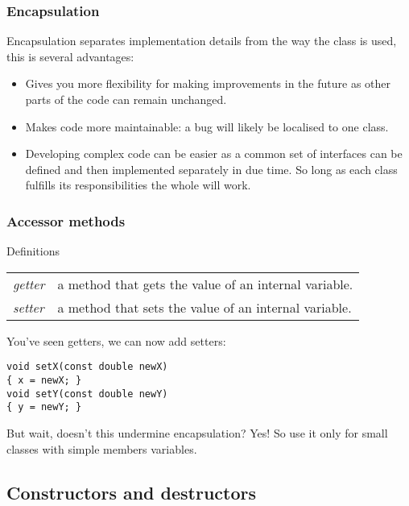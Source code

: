 \documentclass{beamer}
\begin{document}
\begin{frame}[fragile]
  \frametitle{Encapsulation}
  
  Encapsulation separates implementation details from the way the class is used, this is several advantages:
  \pause
  \begin{itemize}
    \item{Gives you more flexibility for making improvements in the future as other parts of the code can remain unchanged.}
    \pause
    \item{Makes code more maintainable: a bug will likely be localised to one class.}
    \pause
    \item{Developing complex code can be easier as a common set of interfaces can be defined and then implemented separately in due time.  So long as each class fulfills its responsibilities the whole will work.}
  \end{itemize}
  \pause

\end{frame}

\begin{frame}[fragile]
  \frametitle{Accessor methods}
  
  \begin{defiblockbaree}{Definitions}
    \begin{tabularx}{\linewidth}{lX}
	    \textit{getter} & a method that gets the value of an internal variable. \\
	    \textit{setter} & a method that sets the value of an internal variable. \\
    \end{tabularx}
  \end{defiblockbaree}
  \pause
  You've seen getters, we can now add setters:
  \begin{lstlisting}
void setX(const double newX)
{ x = newX; }
void setY(const double newY)
{ y = newY; }
  \end{lstlisting}
  \pause
  But wait, doesn't this undermine encapsulation?  Yes!  So use it only for small classes with simple members variables.
\end{frame}

\subsection{Constructors and destructors}
\end{document}
